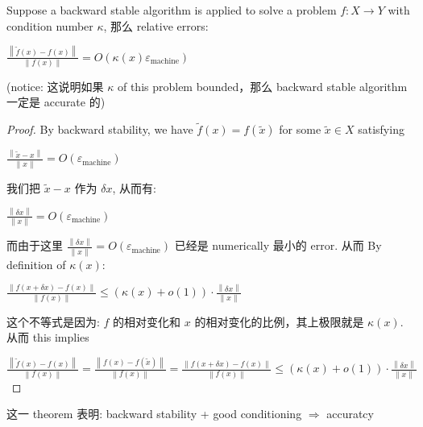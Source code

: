 \begin{theorem}

Suppose a backward stable algorithm is applied to solve a problem \(f:X\rightarrow Y\) with condition number \(\kappa\), 那么 relative errors:

\(\frac{\left\| {\widetilde{f}(x) - f(x)} \right\|}{\left\| {f(x)} \right\|} = O\left( {\kappa(x)\varepsilon_{\text{machine}}} \right)\)

(notice: 这说明如果 \(\kappa\) of this problem bounded，那么 backward stable algorithm 一定是 accurate 的)

\end{theorem}

\begin{proof}

By backward stability, we have \(\widetilde{f}(x) = f\left( \widetilde{x} \right)\) for some \(\widetilde{x} \in X\) satisfying

\(\frac{\left\| {\widetilde{x} - x} \right\|}{\left\| x \right\|} = O\left( \varepsilon_{\text{machine}} \right)\)

我们把 \(\widetilde{x} - x\) 作为 \(\delta x\), 从而有:

\(\frac{\left\| {\delta x} \right\|}{\left\| x \right\|} = O\left( \varepsilon_{\text{machine}} \right)\)

而由于这里 \(\frac{\left\| {\delta x} \right\|}{\left\| x \right\|} = O\left( \varepsilon_{\text{machine}} \right)\) 已经是 numerically 最小的 error. 从而 By definition of \(\kappa(x)\):

\(\frac{\left\| {f\left( {x + \delta x} \right) - f(x)} \right\|}{\left\| {f(x)} \right\|} \leq \left( {\kappa(x) + o(1)} \right) \cdot \frac{\left\| {\delta x} \right\|}{\left\| x \right\|}\)

这个不等式是因为: \(f\) 的相对变化和 \(x\) 的相对变化的比例，其上极限就是 \(\kappa(x)\). 从而 this implies

\(\frac{\left\| {\widetilde{f}(x) - f(x)} \right\|}{\left\| {f(x)} \right\|} = \frac{\left\| {f(x) - f\left( \widetilde{x} \right)} \right\|}{\left\| {f(x)} \right\|} = \frac{\left\| {f\left( {x + \delta x} \right) - f(x)} \right\|}{\left\| {f(x)} \right\|} \leq \left( {\kappa(x) + o(1)} \right) \cdot \frac{\left\| {\delta x} \right\|}{\left\| x \right\|}\)

\end{proof}

这一 theorem 表明: backward stability + good conditioning \(\Rightarrow\) accuratcy
